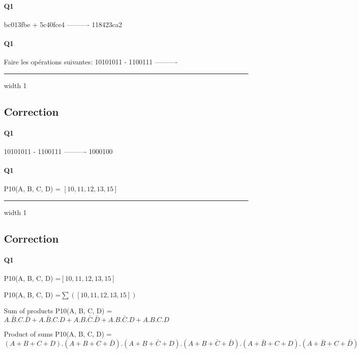 \paragraph{Q1}

  bc013fbe
+ 5c40fce4
----------
 118423ca2

\pagebreak

\paragraph{Q1}

Faire les opérations suivantes: 
  10101011
-  1100111
----------



\hrule width 1\linewidth
\pagebreak

\subsection{Correction}


\paragraph{Q1}

  10101011
-  1100111
----------
   1000100

\pagebreak

\paragraph{Q1}


P10(A, B, C, D) = $[10, 11, 12, 13, 15]$


\hrule width 1\linewidth
\pagebreak

\subsection{Correction}


\paragraph{Q1}

P10(A, B, C, D) =$[10, 11, 12, 13, 15]$

P10(A, B, C, D) =$ \sum([10, 11, 12, 13, 15]) $ 




Sum of products 
 P10(A, B, C, D) = $A.\bar B.C.\bar D + A.\bar B.C.D + A.B.\bar C.\bar D + A.B.\bar C.D + A.B.C.D$


Product of sums 
 P10(A, B, C, D) = $(A+B+C+D) . (A+B+C+\bar D) . (A+B+\bar C+D) . (A+B+\bar C+\bar D) . (A+\bar B+C+D) . (A+\bar B+C+\bar D) . (A+\bar B+\bar C+D) . (A+\bar B+\bar C+\bar D) . (\bar A+B+C+D) . (\bar A+B+C+\bar D) . (\bar A+\bar B+\bar C+D)$


